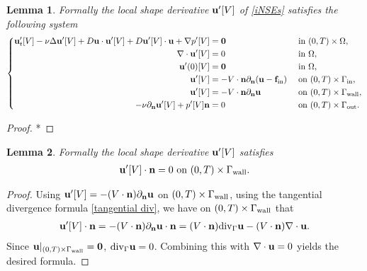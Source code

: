 \documentclass[oneside,11pt]{book}
\numberwithin{equation}{section}
\newtheorem{lemma}{Lemma}[section]
\begin{document}
\begin{lemma}
    Formally the local shape derivative ${\bf u}'[V]$ of \eqref{iNSEs} satisfies the following system
    \begin{equation}
        \label{PDE for ins u', p'}
        \left\{\begin{split}
            {\bf u}_t'[V] - \nu\Delta{\bf u}'[V] + D{\bf u}\cdot{\bf u}'[V] + D{\bf u}'[V]\cdot{\bf u} + \nabla p'[V] &= {\bf 0} &&\mbox{ in } (0,T)\times\Omega,\\
            \nabla\cdot{\bf u}'[V] &= 0 &&\mbox{ in } \Omega,\\
            {\bf u}'(0)[V] &= {\bf 0} &&\mbox{ in } \Omega,\\
            {\bf u}'[V] &= -V\cdot{\bf n}\partial_{\bf n}({\bf u} - {\bf f}_{\rm in}) &&\mbox{ on } (0,T)\times\Gamma_{\rm in},\\
            {\bf u}'[V] &= -V\cdot{\bf n}\partial_{\bf n}{\bf u} &&\mbox{ on } (0,T)\times\Gamma_{\rm wall},\\
            -\nu\partial_{\bf n}{\bf u}'[V] + p'[V]{\bf n} &= 0 &&\mbox{ on } (0,T)\times\Gamma_{\rm out}.
        \end{split}\right.
    \end{equation}
\end{lemma}

\begin{proof}
    *
\end{proof}

\begin{lemma}
    \label{Kasumba_Kunisch2012 Lemma 3.2}
    Formally the local shape derivative ${\bf u}'[V]$ satisfies
    \begin{align}
        {\bf u}'[V]\cdot{\bf n} = 0 \mbox{ on } (0,T)\times\Gamma_{\rm wall}.
    \end{align}
\end{lemma}

\begin{proof}
    Using ${\bf u}'[V] = -(V\cdot{\bf n})\partial_{\bf n}{\bf u}$ on $(0,T)\times\Gamma_{\rm wall}$, using the tangential divergence formula \eqref{tangential div}, we have on $(0,T)\times\Gamma_{\rm wall}$ that
    \begin{align}
        {\bf u}'[V]\cdot{\bf n} = -(V\cdot{\bf n})\partial_{\bf n}{\bf u}\cdot{\bf n} = (V\cdot{\bf n}){\rm div}_\Gamma{\bf u} - (V\cdot{\bf n})\nabla\cdot{\bf u}.
    \end{align}
    Since ${\bf u}|_{(0,T)\times\Gamma_{\rm wall}} = {\bf 0}$, ${\rm div}_\Gamma{\bf u} = 0$. Combining this with $\nabla\cdot{\bf u} = 0$ yields the desired formula.
\end{proof}
\end{document}
